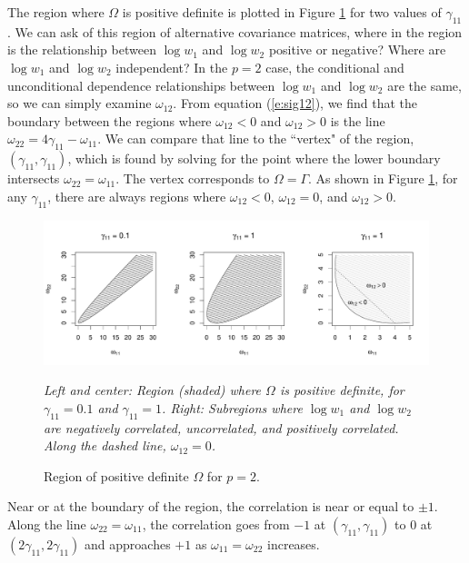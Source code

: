 \documentclass[12pt]{article}
\begin{document}
The region where $\Omega$ is positive definite is plotted in Figure \ref{f:regions} for two values of $\gamma_{11}$. We can ask of this region of alternative covariance matrices, where in the region is the relationship between $\log w_1$ and $\log w_2$ positive or negative? Where are $\log w_1$ and $\log w_2$ independent? In the $p = 2$ case, the conditional and unconditional dependence relationships between $\log w_1$ and $\log w_2$ are the same, so we can simply examine $\omega_{12}$. From equation (\ref{e:sig12}), we find that the boundary between the regions where $\omega_{12} < 0$ and $\omega_{12} > 0$ is the line $\omega_{22} = 4\gamma_{11} - \omega_{11}$. We can compare that line to the ``vertex" of the region, $(\gamma_{11}, \gamma_{11})$, which is found by solving for the point where the lower boundary intersects $\omega_{22} = \omega_{11}$. The vertex corresponds to $\Omega = \Gamma$. As shown in Figure \ref{f:regions}, for any $\gamma_{11}$, there are always regions where $\omega_{12} < 0$, $\omega_{12} = 0$, and $\omega_{12} > 0$.

\begin{figure}
\caption{Region of positive definite $\Omega$ for $p=2$.}
\label{f:regions}
\begin{center}
\includegraphics[width=6.5in]{figs/regions-2.pdf}
\begin{small}
\textit{Left and center: Region (shaded) where $\Omega$ is positive definite, for $\gamma_{11} = 0.1$ and $\gamma_{11} = 1$. Right: Subregions where $\log w_1$ and $\log w_2$ are negatively correlated, uncorrelated, and positively correlated. Along the dashed line, $\omega_{12} = 0$.}
\end{small}
\end{center}
\end{figure}

Near or at the boundary of the region, the correlation is near or equal to $\pm 1$. Along the line $\omega_{22} = \omega_{11}$, the correlation goes from $-1$ at $(\gamma_{11}, \gamma_{11})$ to 0 at $(2\gamma_{11}, 2\gamma_{11})$ and approaches $+1$ as $\omega_{11} = \omega_{22}$ increases.
\end{document}
